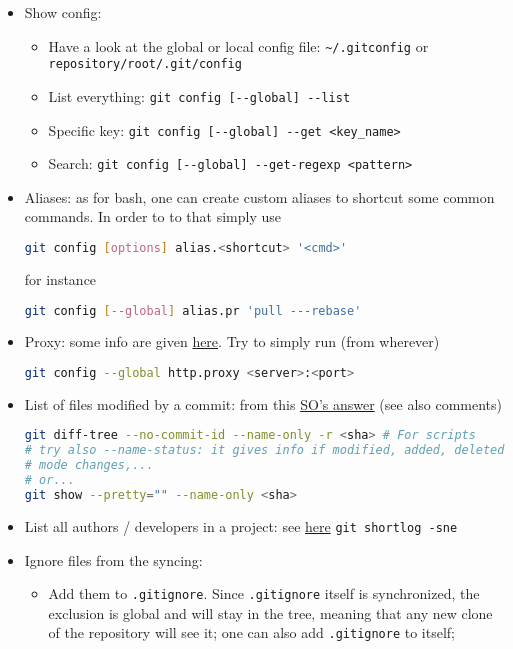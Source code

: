 \documentclass[a4paper,12pt,%
              final%
              ]{article}
\begin{document}
\begin{itemize}
\begin{itemize}
    \end{itemize}
  \item Show config:
    \begin{itemize}
      \item Have a look at the global or local config file: \verb|~/.gitconfig| or \verb|repository/root/.git/config|
      \item List everything: \verb|git config [--global] --list|
      \item Specific key: \verb|git config [--global] --get <key_name>|
      \item Search: \verb|git config [--global] --get-regexp <pattern>|
    \end{itemize}
  \item Aliases: as for bash, one can create custom aliases to shortcut some common commands. In order to to that simply use
\begin{lstlisting}[language=bash]
git config [options] alias.<shortcut> '<cmd>'
\end{lstlisting}
        for instance
\begin{lstlisting}[language=bash]
git config [--global] alias.pr 'pull ---rebase'
\end{lstlisting}
  \item Proxy: some info are given \href{https://gist.github.com/evantoli/f8c23a37eb3558ab8765}{here}. Try to simply run (from wherever)
\begin{lstlisting}[language=bash]
git config --global http.proxy <server>:<port>
\end{lstlisting}
  \item List of files modified by a commit: from this \href{https://stackoverflow.com/a/424142/12152457}{SO's answer} (see also comments)
\begin{lstlisting}[language=bash]
git diff-tree --no-commit-id --name-only -r <sha> # For scripts
# try also --name-status: it gives info if modified, added, deleted,
# mode changes,...
# or...
git show --pretty="" --name-only <sha>
\end{lstlisting}
  \item List all authors / developers in a project: see \href{https://stackoverflow.com/questions/9597410/list-all-developers-on-a-project-in-git}{here} \verb|git shortlog -sne|
  \item Ignore files from the syncing:
    \begin{itemize}
      \item Add them to \texttt{.gitignore}. Since \texttt{.gitignore} itself is synchronized, the exclusion is global and will stay in the tree, meaning that any new clone of the repository will see it; one can also add \texttt{.gitignore} to itself;

\end{itemize}
\end{itemize}
\end{document}
